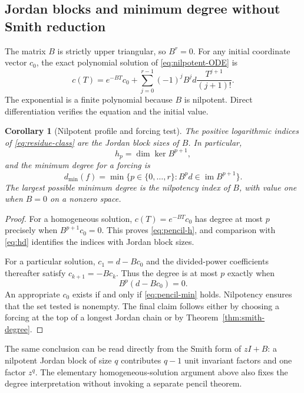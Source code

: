 \documentclass[11pt,a4paper]{article}
\numberwithin{equation}{section}
\newtheorem{corollary}[theorem]{Corollary}
\theoremstyle{definition}
\theoremstyle{remark}
\theoremstyle{definition}
\newcommand{\im}{\operatorname{im}}
\begin{document}
\subsection{Jordan blocks and minimum degree without Smith reduction}
The matrix $B$ is strictly upper triangular, so $B^r=0$. For any initial coordinate vector $c_0$, the exact polynomial solution of \eqref{eq:nilpotent-ODE} is
\begin{equation}
 c(T)=e^{-BT}c_0+
 \sum_{j=0}^{r-1}(-1)^j B^jd\frac{T^{j+1}}{(j+1)!}.
 \label{eq:pencil-solution}
\end{equation}
The exponential is a finite polynomial because $B$ is nilpotent. Direct differentiation verifies the equation and the initial value.

\begin{corollary}[Nilpotent profile and forcing test]
\label{cor:pencil-profile}
The positive logarithmic indices of \eqref{eq:residue-class} are the Jordan block sizes of $B$. In particular,
\begin{equation}
 h_p=\dim\ker B^{p+1},
 \label{eq:pencil-h}
\end{equation}
and the minimum degree for a forcing is
\begin{equation}
 d_{\min}(f)=
 \min\{p\in\{0,\ldots,r\}:B^pd\in\im B^{p+1}\}.
 \label{eq:pencil-min}
\end{equation}
The largest possible minimum degree is the nilpotency index of $B$, with value one when $B=0$ on a nonzero space.
\end{corollary}
\begin{proof}
For a homogeneous solution, $c(T)=e^{-BT}c_0$ has degree at most $p$ precisely when $B^{p+1}c_0=0$. This proves \eqref{eq:pencil-h}, and comparison with \eqref{eq:hd} identifies the indices with Jordan block sizes.

For a particular solution, $c_1=d-Bc_0$ and the divided-power coefficients thereafter satisfy $c_{k+1}=-Bc_k$. Thus the degree is at most $p$ exactly when
\[
 B^p(d-Bc_0)=0.
\]
An appropriate $c_0$ exists if and only if \eqref{eq:pencil-min} holds. Nilpotency ensures that the set tested is nonempty. The final claim follows either by choosing a forcing at the top of a longest Jordan chain or by Theorem~\ref{thm:smith-degree}.
\end{proof}

The same conclusion can be read directly from the Smith form of $zI+B$: a nilpotent Jordan block of size $q$ contributes $q-1$ unit invariant factors and one factor $z^q$. The elementary homogeneous-solution argument above also fixes the degree interpretation without invoking a separate pencil theorem.
\end{document}
